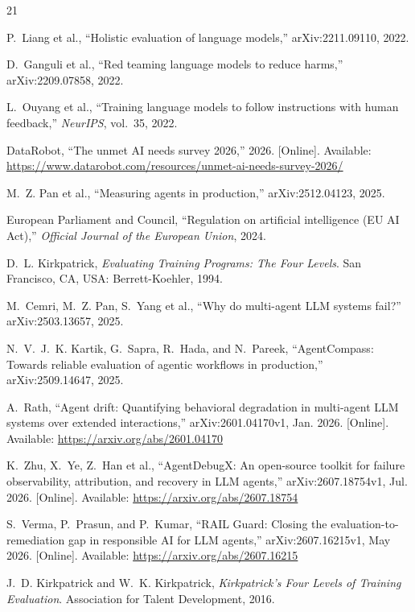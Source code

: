 \documentclass[conference]{IEEEtran}
\begin{document}
\begin{thebibliography}{21}

P.~Liang et al., ``Holistic evaluation of language models,'' arXiv:2211.09110, 2022.

D.~Ganguli et al., ``Red teaming language models to reduce harms,'' arXiv:2209.07858, 2022.

L.~Ouyang et al., ``Training language models to follow instructions with human feedback,'' \emph{NeurIPS}, vol.~35, 2022.

DataRobot, ``The unmet AI needs survey 2026,'' 2026. [Online]. Available: \url{https://www.datarobot.com/resources/unmet-ai-needs-survey-2026/}

M.~Z. Pan et al., ``Measuring agents in production,'' arXiv:2512.04123, 2025.

European Parliament and Council, ``Regulation on artificial intelligence (EU AI Act),'' \emph{Official Journal of the European Union}, 2024.

D.~L. Kirkpatrick, \emph{Evaluating Training Programs: The Four Levels}. San Francisco, CA, USA: Berrett-Koehler, 1994.

M.~Cemri, M.~Z. Pan, S.~Yang et al., ``Why do multi-agent LLM systems fail?'' arXiv:2503.13657, 2025.

N.~V.~J.~K. Kartik, G.~Sapra, R.~Hada, and N.~Pareek, ``AgentCompass: Towards reliable evaluation of agentic workflows in production,'' arXiv:2509.14647, 2025.

A.~Rath, ``Agent drift: Quantifying behavioral degradation in multi-agent LLM systems over extended interactions,'' arXiv:2601.04170v1, Jan. 2026. [Online]. Available: \url{https://arxiv.org/abs/2601.04170}

K.~Zhu, X.~Ye, Z.~Han et al., ``AgentDebugX: An open-source toolkit for failure observability, attribution, and recovery in LLM agents,'' arXiv:2607.18754v1, Jul. 2026. [Online]. Available: \url{https://arxiv.org/abs/2607.18754}

S.~Verma, P.~Prasun, and P.~Kumar, ``RAIL Guard: Closing the evaluation-to-remediation gap in responsible AI for LLM agents,'' arXiv:2607.16215v1, May 2026. [Online]. Available: \url{https://arxiv.org/abs/2607.16215}

J.~D. Kirkpatrick and W.~K. Kirkpatrick, \emph{Kirkpatrick's Four Levels of Training Evaluation}. Association for Talent Development, 2016.


\end{thebibliography}
\end{document}
